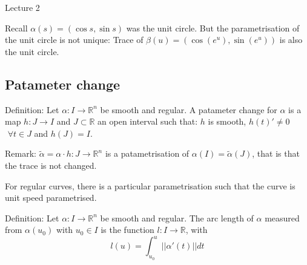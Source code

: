 \begin{center}

Lecture 2

\end{center}

Recall $\alpha (s) = (\cos s, \sin s)$ was the unit circle. But the parametrisation of the unit circle is not unique: Trace of $\beta (u) = (\cos (e^u), \sin (e^u))$ is also the unit circle.

\subsection{Patameter change}

Definition: Let $\alpha : I \rightarrow \mathbb{R}^n$ be smooth and regular. A patameter change for $\alpha$ is a map $h : J \rightarrow I$ and $J \subset \mathbb{R}$ an open interval such that: $h$ is smooth, $h(t)' \neq 0$ $\, \, \forall t \in J$ and $h(J) = I$.

Remark: $\tilde{\alpha} = \alpha \cdot h : J \rightarrow \mathbb{R}^n$ is a patametrisation of $\alpha (I) = \tilde{\alpha} (J)$, that is that the trace is not changed.

For regular curves, there is a particular parametrisation such that the curve is unit speed parametrised.

Definition: Let $\alpha : I \rightarrow \mathbb{R}^n$ be smooth and regular. The arc length of $\alpha$ measured from $\alpha (u_0)$ with $u_0 \in I$ is the function $l : I \rightarrow \mathbb{R}$, with $$l (u) = \int_{u_0}^u || \alpha ' (t) || dt$$